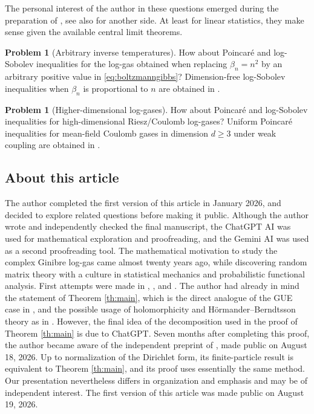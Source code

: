 \documentclass[11pt,reqno]{amsart}
\numberwithin{equation}{section}%
\numberwithin{figure}{section}%
\numberwithin{table}{section}
\theoremstyle{plain}
\theoremstyle{definition}
\newtheorem{problem}[theorem]{Problem}
\begin{document}
The personal interest of the author in these questions emerged during the
preparation of \cite*{zbMATH06371853}, see also
\cite{RosenzweigSerfatyModulatedLSI} for another side. At least for linear
statistics, they make sense given the available central limit theorems.

\begin{problem}[Arbitrary inverse temperatures]
  How about Poincaré and log-Sobolev inequalities for the log-gas obtained
  when replacing $\beta_n=n^2$ by an arbitrary positive value in
  \eqref{eq:boltzmanngibbs}? Dimension-free log-Sobolev inequalities when
  $\beta_n$ is proportional to $n$ are obtained in \cite{rosenzweig}.
\end{problem}

\begin{problem}[Higher-dimensional log-gases]
  How about Poincaré and log-Sobolev inequalities for high-dimensional
  Riesz/Coulomb log-gases? Uniform Poincaré inequalities for mean-field
  Coulomb gases in dimension $d\geq3$ under weak coupling are obtained in
  \cite{becker-menegaki}.
\end{problem}

\subsection{About this article}

The author completed the first version of this article in January 2026, and
decided to explore related questions before making it public. Although the
author wrote and independently checked the final manuscript, the ChatGPT AI
was used for mathematical exploration and proofreading, and the Gemini AI was
used as a second proofreading tool. The mathematical motivation to study the
complex Ginibre log-gas came almost twenty years ago, while discovering random
matrix theory with a culture in statistical mechanics and probabilistic
functional analysis. First attempts were made in \cite*{zbMATH06371853},
\cite*{BolleyChafaiFontbona}, and \cite*{ChafaiHardyMaida}. The author had
already in mind the statement of Theorem \ref{th:main}, which is the direct
analogue of the GUE case in \cite{ChafaiLehec}, and the possible usage of
holomorphicity and Hörmander--Berndtsson theory as in
\cite{CorderoErausquinBerndtssonPrekopa}. However, the final idea of the
decomposition used in the proof of Theorem \ref{th:main} is due to ChatGPT.
Seven months after completing this proof, the author became aware of the
independent preprint of \cite{suzuki2026spectralgapunlabelledginibre}, made
public on August 18, 2026. Up to normalization of the Dirichlet form, its
finite-particle result is equivalent to Theorem \ref{th:main}, and its proof
uses essentially the same method. Our presentation nevertheless differs in
organization and emphasis and may be of independent interest. The first
version of this article was made public on August 19, 2026.
\end{document}
